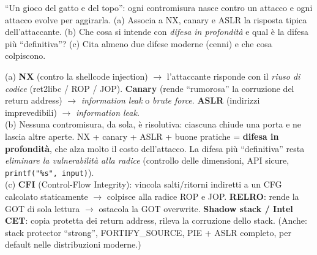 \question[6]
``Un gioco del gatto e del topo'': ogni contromisura nasce contro un attacco e ogni attacco evolve per aggirarla. (a) Associa a NX, canary e ASLR la risposta tipica dell'attaccante. (b) Che cosa si intende con \emph{difesa in profondità} e qual è la difesa più ``definitiva''? (c) Cita almeno due difese moderne (cenni) e che cosa colpiscono.
\begin{solution}
(a) \textbf{NX} (contro la shellcode injection) $\to$ l'attaccante risponde con il \emph{riuso di codice} (ret2libc / ROP / JOP). \textbf{Canary} (rende ``rumorosa'' la corruzione del return address) $\to$ \emph{information leak} o \emph{brute force}. \textbf{ASLR} (indirizzi imprevedibili) $\to$ \emph{information leak}.\\
(b) Nessuna contromisura, da sola, è risolutiva: ciascuna chiude una porta e ne lascia altre aperte. NX + canary + ASLR + buone pratiche = \textbf{difesa in profondità}, che alza molto il costo dell'attacco. La difesa più ``definitiva'' resta \emph{eliminare la vulnerabilità alla radice} (controllo delle dimensioni, API sicure, \lstinline|printf("%s", input)|).\\
(c) \textbf{CFI} (Control-Flow Integrity): vincola salti/ritorni indiretti a un CFG calcolato staticamente $\to$ colpisce alla radice ROP e JOP. \textbf{RELRO}: rende la GOT di sola lettura $\to$ ostacola la GOT overwrite. \textbf{Shadow stack / Intel CET}: copia protetta dei return address, rileva la corruzione dello stack. (Anche: stack protector ``strong'', FORTIFY\_SOURCE, PIE + ASLR completo, per default nelle distribuzioni moderne.)
\end{solution}
